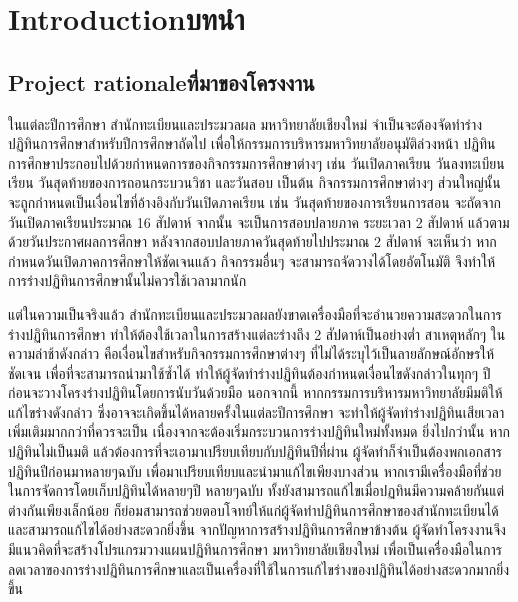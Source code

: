 \chapter{\ifenglish Introduction\else บทนำ\fi}

\section{\ifenglish Project rationale\else ที่มาของโครงงาน\fi}
ในแต่ละปีการศึกษา สำนักทะเบียนและประมวลผล มหาวิทยาลัยเชียงใหม่ จำเป็นจะต้องจัดทำร่างปฏิทินการศึกษาสำหรับปีการศึกษาถัดไป เพื่อให้กรรมการบริหารมหาวิทยาลัยอนุมัติล่วงหน้า
%
ปฏิทินการศึกษาประกอบไปด้วยกำหนดการของกิจกรรมการศึกษาต่างๆ เช่น วันเปิดภาคเรียน วันลงทะเบียนเรียน วันสุดท้ายของการถอนกระบวนวิชา และวันสอบ เป็นต้น
%
กิจกรรมการศึกษาต่างๆ ส่วนใหญ่นั้นจะถูกกำหนดเป็นเงื่อนไขที่อ้างอิงกับวันเปิดภาคเรียน เช่น วันสุดท้ายของการเรียนการสอน จะถัดจากวันเปิดภาคเรียนประมาณ 16 สัปดาห์ จากนั้น จะเป็นการสอบปลายภาค ระยะเวลา 2 สัปดาห์ แล้วตามด้วยวันประกาศผลการศึกษา หลังจากสอบปลายภาควันสุดท้ายไปประมาณ 2 สัปดาห์
%
จะเห็นว่า หากกำหนดวันเปิดภาคการศึกษาให้ชัดเจนแล้ว กิจกรรมอื่นๆ จะสามารถจัดวางได้โดยอัตโนมัติ จึงทำให้การร่างปฏิทินการศึกษานั้นไม่ควรใช้เวลามากนัก

แต่ในความเป็นจริงแล้ว สำนักทะเบียนและประมวลผลยังขาดเครื่องมือที่จะอำนวยความสะดวกในการร่างปฏิทินการศึกษา ทำให้ต้องใช้เวลาในการสร้างแต่ละร่างถึง 2 สัปดาห์เป็นอย่างต่ำ
%
สาเหตุหลักๆ ในความล่าช้าดังกล่าว คือเงื่อนไขสำหรับกิจกรรมการศึกษาต่างๆ ที่ไม่ได้ระบุไว้เป็นลายลักษณ์อักษรให้ชัดเจน เพื่อที่จะสามารถนำมาใช้ซ้ำได้ ทำให้ผู้จัดทำร่างปฏิทินต้องกำหนดเงื่อนไขดังกล่าวในทุกๆ ปี ก่อนจะวางโครงร่างปฏิทินโดยการนับวันด้วยมือ
%
นอกจากนี้ หากกรรมการบริหารมหาวิทยาลัยมีมติให้แก้ไขร่างดังกล่าว ซึ่งอาจจะเกิดขึ้นได้หลายครั้งในแต่ละปีการศึกษา จะทำให้ผู้จัดทำร่างปฏิทินเสียเวลาเพิ่มเติมมากกว่าที่ควรจะเป็น เนื่องจากจะต้องเริ่มกระบวนการร่างปฏิทินใหม่ทั้งหมด
%
ยิ่งไปกว่านั้น หากปฏิทินไม่เป็นมติ แล้วต้องการที่จะเอามาเปรียบเทียบกับปฏิทินปีที่ผ่าน ผู้จัดทำก็จำเป็นต้องพกเอกสารปฏิทินปีก่อนมาหลายๆฉบับ เพื่อมาเปรียบเทียบและนำมาแก้ไขเพียงบางส่วน หากเรามีเครื่องมือที่ช่วยในการจัดการโดยเก็บปฏิทินได้หลายๆปี หลายๆฉบับ ทั้งยังสามารถแก้ไขเมื่อปฏทินมีความคล้ายกันแต่ต่างกันเพียงเล็กน้อย
%
ก็ย่อมสามารถช่วยตอบโจทย์ให้แก่ผู้จัดทำปฏิทินการศึกษาของสำนักทะเบียนได้และสามารถแก้ไขได้อย่างสะดวกยิ่งขึ้น 
จากปัญหาการสร้างปฏิทินการศึกษาข้างต้น ผู้จัดทำโครงงานจึงมีแนวคิดที่จะสร้างโปรแกรมวางแผนปฏิทินการศึกษา มหาวิทยาลัยเชียงใหม่ เพื่อเป็นเครื่องมือในการลดเวลาของการร่างปฏิทินการศึกษาและเป็นเครื่องที่ใช้ในการแก้ไขร่างของปฏิทินได้อย่างสะดวกมากยิ่งขึ้น  

